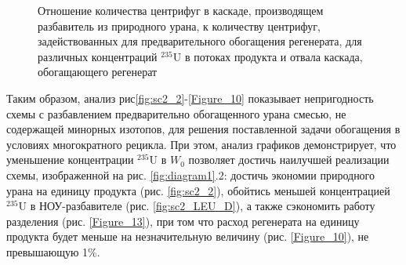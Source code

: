 \begin{figure}[ht]
  \caption{Отношение количества центрифуг в каскаде, производящем разбавитель из природного урана, к количеству центрифуг, задействованных для предварительного обогащения регенерата, для различных концентраций $^{235}$U в потоках продукта и отвала каскада, обогащающего регенерат}\label{myplot}
\end{figure}

Таким образом, анализ рис\ref{fig:sc2_2}-\ref{Figure_10} показывает непригодность схемы с разбавлением предварительно обогащенного урана смесью, не содержащей минорных изотопов, для решения поставленной задачи обогащения в условиях многократного рецикла. При этом, анализ графиков демонстрирует, что уменьшение концентрации $^{235}$U в $W_0$ позволяет достичь наилучшей реализации схемы, изображенной на рис. \ref{fig:diagram1}.2: достичь экономии природного урана на единицу продукта (рис. \ref{fig:sc2_2}), обойтись меньшей концентрацией $^{235}$U в НОУ-разбавителе (рис. \ref{fig:sc2_LEU_D}), а также сэкономить работу разделения (рис. \ref{Figure_13}), при том что расход регенерата на единицу продукта будет меньше на незначительную величину (рис. \ref{Figure_10}), не превышающую 1\%. 


